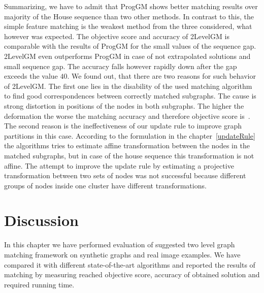 Summarizing, we have to admit that ProgGM shows better matching results over majority of the House sequence than two other methods. In contrast to this, the simple feature matching is the weakest method from the three considered, what however was expected. The objective score and accuracy of 2LevelGM is comparable with the results of ProgGM for the small values of the sequence gap. 2LevelGM even outperforms ProgGM in case of not extrapolated solutions and small sequence gap. The accuracy falls however rapidly down after the gap exceeds the value $40$. We found out, that there are two reasons for such behavior of 2LevelGM. The first one lies in the disability of the used matching algorithm to find good correspondences between correctly matched subgraphs. The cause is strong distortion in positions of the nodes in both subgraphs. The higher the deformation the worse the matching accuracy and therefore objective score is~\cite{Cho2010_RRWM}.
The second reason is the ineffectiveness of our update rule to improve graph partitions in this case. According to the formulation in the chapter~\ref{updateRule} the algorithms tries to estimate affine transformation between the nodes in the matched subgraphs, but in case of the house sequence this transformation is not affine. The attempt to improve the update rule by estimating a projective transformation between two sets of nodes was not successful because different groups of nodes inside one cluster have different transformations.

\FloatBarrier


\section{Discussion}

In this chapter we have performed evaluation of suggested two level graph matching framework on synthetic graphs and real image examples. We have compared it with different state-of-the-art algorithms and reported the results of matching by measuring reached objective score, accuracy of obtained solution and required running time.

